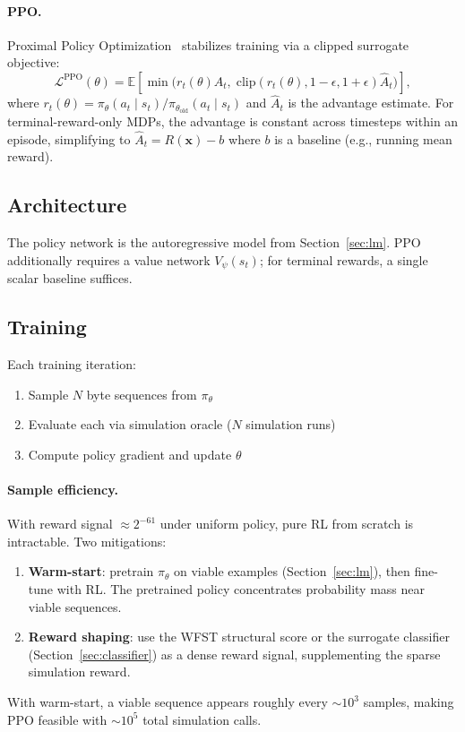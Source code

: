 \documentclass{article}
\begin{document}
\paragraph{PPO.}
Proximal Policy Optimization~\cite{schulman2017ppo} stabilizes training via
a clipped surrogate objective:
\begin{equation}
  \mathcal{L}^{\text{PPO}}(\theta) = \mathbb{E}\left[
    \min\bigl(r_t(\theta) \hat{A}_t,\;
    \text{clip}(r_t(\theta), 1{-}\epsilon, 1{+}\epsilon)\hat{A}_t\bigr)
  \right],
\end{equation}
where $r_t(\theta) = \pi_\theta(a_t \mid s_t) / \pi_{\theta_{\text{old}}}(a_t \mid s_t)$
and $\hat{A}_t$ is the advantage estimate.  For terminal-reward-only MDPs,
the advantage is constant across timesteps within an episode, simplifying to
$\hat{A}_t = R(\mathbf{x}) - b$ where $b$ is a baseline (e.g., running mean reward).

\subsection{Architecture}

The policy network is the autoregressive model from Section~\ref{sec:lm}.
PPO additionally requires a value network $V_\psi(s_t)$; for terminal
rewards, a single scalar baseline suffices.

\subsection{Training}

Each training iteration:
\begin{enumerate}
  \item Sample $N$ byte sequences from $\pi_\theta$
  \item Evaluate each via simulation oracle ($N$ simulation runs)
  \item Compute policy gradient and update $\theta$
\end{enumerate}

\paragraph{Sample efficiency.}
With reward signal $\approx 2^{-61}$ under uniform policy, pure RL from
scratch is intractable.  Two mitigations:
\begin{enumerate}
  \item \textbf{Warm-start}: pretrain $\pi_\theta$ on viable examples
        (Section~\ref{sec:lm}), then fine-tune with RL. The pretrained
        policy concentrates probability mass near viable sequences.
  \item \textbf{Reward shaping}: use the WFST structural score or the
        surrogate classifier (Section~\ref{sec:classifier}) as a dense
        reward signal, supplementing the sparse simulation reward.
\end{enumerate}
With warm-start, a viable sequence appears roughly every ${\sim}10^3$
samples, making PPO feasible with ${\sim}10^5$ total simulation calls.
\end{document}
